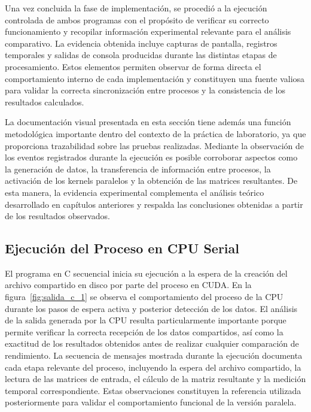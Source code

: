 Una vez concluida la fase de implementación, se procedió a la ejecución controlada de ambos programas con el propósito de verificar su correcto funcionamiento y recopilar información experimental relevante para el análisis comparativo. La evidencia obtenida incluye capturas de pantalla, registros temporales y salidas de consola producidas durante las distintas etapas de procesamiento. Estos elementos permiten observar de forma directa el comportamiento interno de cada implementación y constituyen una fuente valiosa para validar la correcta sincronización entre procesos y la consistencia de los resultados calculados. 

La documentación visual presentada en esta sección tiene además una función metodológica importante dentro del contexto de la práctica de laboratorio, ya que proporciona trazabilidad sobre las pruebas realizadas. Mediante la observación de los eventos registrados durante la ejecución es posible corroborar aspectos como la generación de datos, la transferencia de información entre procesos, la activación de los kernels paralelos y la obtención de las matrices resultantes. De esta manera, la evidencia experimental complementa el análisis teórico desarrollado en capítulos anteriores y respalda las conclusiones obtenidas a partir de los resultados observados.

\subsection{Ejecución del Proceso en CPU Serial}

El programa en C secuencial inicia su ejecución a la espera de la creación del archivo compartido en disco por parte del proceso en CUDA. En la figura~\ref{fig:salida_c_1} se observa el comportamiento del proceso de la CPU durante los pasos de espera activa y posterior detección de los datos. El análisis de la salida generada por la CPU resulta particularmente importante porque permite verificar la correcta recepción de los datos compartidos, así como la exactitud de los resultados obtenidos antes de realizar cualquier comparación de rendimiento. La secuencia de mensajes mostrada durante la ejecución documenta cada etapa relevante del proceso, incluyendo la espera del archivo compartido, la lectura de las matrices de entrada, el cálculo de la matriz resultante y la medición temporal correspondiente. Estas observaciones constituyen la referencia utilizada posteriormente para validar el comportamiento funcional de la versión paralela.

